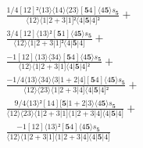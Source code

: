 \documentclass[varwidth, border=5pt]{standalone}
\begin{document}
\begin{my}
$\begin{gathered}
\scriptscriptstyle\frac{1/4[12]²⟨13⟩⟨14⟩⟨23⟩[𝟓4]⟨4𝟓⟩s_{𝟓}}{⟨12⟩⟨1|2+3|1]²⟨4|𝟓|4]²} +\\
\scriptscriptstyle\frac{3/4[12]⟨13⟩²[𝟓1]⟨4𝟓⟩s_{𝟓}}{⟨12⟩⟨1|2+3|1]²⟨4|𝟓|4]} +\\
\scriptscriptstyle\frac{-1[12]⟨13⟩⟨34⟩[𝟓4]⟨4𝟓⟩s_{𝟓}}{⟨12⟩⟨1|2+3|1]⟨4|𝟓|4]²} +\\
\scriptscriptstyle\frac{-1/4⟨13⟩⟨34⟩⟨3|1+2|4][𝟓4]⟨4𝟓⟩s_{𝟓}}{⟨12⟩⟨23⟩⟨1|2+3|4]⟨4|𝟓|4]²} +\\
\scriptscriptstyle\frac{9/4⟨13⟩²[14][𝟓|1+2|3⟩⟨4𝟓⟩s_{𝟓}}{⟨12⟩⟨23⟩⟨1|2+3|1]⟨1|2+3|4]⟨4|𝟓|4]} +\\
\scriptscriptstyle\frac{-1[12]⟨13⟩²[𝟓4]⟨4𝟓⟩s_{𝟓}}{⟨12⟩⟨1|2+3|1]⟨1|2+3|4]⟨4|𝟓|4]} \phantom{+}
\end{gathered}$
\end{my}
\end{document}
